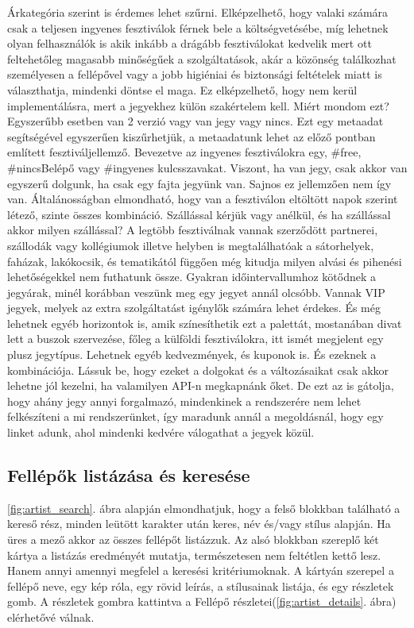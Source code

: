 Árkategória szerint is érdemes lehet szűrni. Elképzelhető, hogy valaki számára csak a teljesen ingyenes fesztiválok férnek bele a költségvetésébe, míg lehetnek olyan felhasználók is akik inkább a drágább fesztiválokat kedvelik mert ott feltehetőleg magasabb minőségűek a szolgáltatások, akár a közönség találkozhat személyesen a fellépővel vagy a jobb higiéniai és biztonsági feltételek miatt is választhatja, mindenki döntse el maga. Ez elképzelhető, hogy nem kerül implementálásra, mert a jegyekhez külön szakértelem kell. Miért mondom ezt? Egyszerűbb esetben van 2 verzió vagy van jegy vagy nincs. Ezt egy metaadat segítségével egyszerűen kiszűrhetjük, a metaadatunk lehet az előző pontban említett fesztiváljellemző. Bevezetve az ingyenes fesztiválokra egy, \#free, \#nincsBelépő vagy \#ingyenes kulcsszavakat. Viszont, ha van jegy, csak akkor van egyszerű dolgunk, ha csak egy fajta jegyünk van. Sajnos ez jellemzően nem így van. Általánosságban elmondható, hogy van a fesztiválon eltöltött napok szerint létező, szinte összes kombináció. Szállással kérjük vagy anélkül, és ha szállással akkor milyen szállással? A legtöbb fesztiválnak vannak szerződött partnerei, szállodák vagy kollégiumok illetve helyben is megtalálhatóak a sátorhelyek, faházak, lakókocsik, és tematikától függően még kitudja milyen alvási és pihenési lehetőségekkel nem futhatunk össze. Gyakran időintervallumhoz kötődnek a jegyárak, minél korábban veszünk meg egy jegyet annál olcsóbb. Vannak VIP jegyek, melyek az extra szolgáltatást igénylők számára lehet érdekes. És még lehetnek egyéb horizontok is, amik színesíthetik ezt a palettát, mostanában divat lett a buszok szervezése, főleg a  külföldi fesztiválokra, itt ismét megjelent egy plusz jegytípus. Lehetnek egyéb kedvezmények, és kuponok is. És ezeknek a kombinációja. Lássuk be, hogy ezeket a dolgokat és a változásaikat csak akkor lehetne jól kezelni, ha valamilyen API-n megkapnánk őket. De ezt az is gátolja, hogy ahány jegy annyi forgalmazó, mindenkinek a rendszerére nem lehet felkészíteni a mi rendszerünket, így maradunk annál a megoldásnál, hogy egy linket adunk, ahol mindenki kedvére válogathat a jegyek közül.

\subsection{Fellépők listázása és keresése}

\ref{fig:artist_search}. ábra alapján elmondhatjuk, hogy a felső blokkban található a kereső rész, minden leütött karakter után keres, név és/vagy stílus alapján. Ha üres a mező akkor az összes fellépőt listázzuk. Az alsó blokkban szereplő két kártya a listázás eredményét mutatja, természetesen nem feltétlen kettő lesz. Hanem annyi amennyi megfelel a keresési kritériumoknak. A kártyán szerepel a fellépő neve, egy kép róla, egy rövid leírás, a stílusainak listája, és egy részletek gomb. A részletek gombra kattintva a Fellépő részletei(\ref{fig:artist_details}. ábra) elérhetővé válnak.

